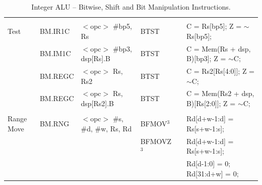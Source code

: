 \begin{table}
\begin{subtable}{\linewidth}
\begin{center}
\begin{tabular}{llllll}
                   &                   &                                       &                   &                   &                                                                               \\
Test               & BM.IR1C           & $<$opc$>$ \#bp5, Rs                   & BTST              & \flags{--!!}      & C = Rs[bp5]; Z = $\sim$Rs[bp5];                                               \\
                   & BM.IM1C           & $<$opc$>$ \#bp3, dsp[Rs].B            & BTST              & \flags{--!!}      & C = Mem(Rs + dsp, B)[bp3]; Z = $\sim$C;                                       \\
                   & BM.REGC           & $<$opc$>$ Rs, Rs2                     & BTST              & \flags{--!!}      & C = Rs2[Rs[4:0]]; Z = $\sim$C;                                                \\
                   & BM.REGC           & $<$opc$>$ Rs, dsp[Rs2].B              & BTST              & \flags{--!!}      & C = Mem(Rs2 + dsp, B)[Rs[2:0]]; Z = $\sim$C;                                  \\
                   &                   &                                       &                   &                   &                                                                               \\
Range Move         & BM.RNG            & $<$opc$>$ \#s, \#d, \#w, Rs, Rd       & BFMOV$^3$         & \flags{----}      & Rd[d+w-1:d] = Rs[s+w-1:s];                                                    \\
                   &                   &                                       & BFMOVZ$^3$        & \flags{----}      & Rd[d+w-1:d] = Rs[s+w-1:s];                                                    \\
                   &                   &                                       &                   &                   & Rd[d-1:0] = 0; Rd[31:d+w] = 0;                                                \\ \hline
\end{tabular}
\end{center}
\captionsetup{font=scriptsize, labelfont=scriptsize}
\caption{Bit Manipulation Instructions.}
\end{subtable}

\captionsetup{font=scriptsize, labelfont=scriptsize}
\caption{Integer ALU -- Bitwise, Shift and Bit Manipulation Instructions.}
\end{table}

